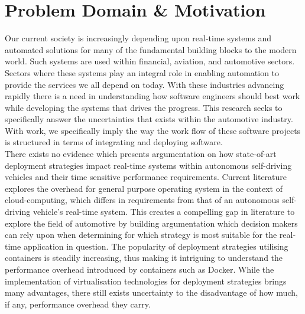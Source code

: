 

\section{Problem Domain \& Motivation}
Our current society is increasingly depending upon real-time systems and automated solutions for many of the fundamental building blocks to the modern world. Such systems are used within financial, aviation, and automotive sectors. Sectors where these systems play an integral role in enabling automation to provide the services we all depend on today. With these industries advancing rapidly there is a need in understanding how software engineers should best work while developing the systems that drives the progress. This research seeks to specifically answer the uncertainties that exists within the automotive industry. With work, we specifically imply the way the work flow of these software projects is structured in terms of integrating and deploying software.\\

There exists no evidence which presents argumentation on how state-of-art deployment strategies impact real-time systems within autonomous self-driving vehicles and their time sensitive performance requirements. Current literature \cite{vmvscontainers} explores the overhead for general purpose operating system in the context of cloud-computing, which differs in requirements from that of an autonomous self-driving vehicle's real-time system. This creates a compelling gap in literature to explore the field of automotive by building argumentation which decision makers can rely upon when determining for which strategy is most suitable for the real-time application in question. The popularity of deployment strategies utilising containers is steadily increasing, thus making it intriguing to understand the performance overhead introduced by containers such as Docker. While the implementation of virtualisation technologies for deployment strategies brings many advantages, there still exists uncertainty to the disadvantage of how much, if any, performance overhead they carry.\\

